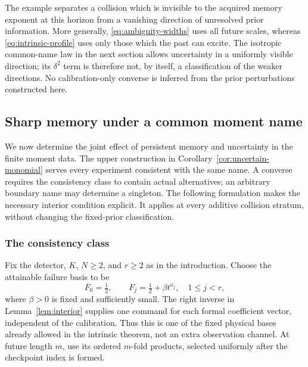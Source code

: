 The example separates a collision which is invisible to the acquired
memory exponent at this horizon from a vanishing direction of unresolved
prior information. More generally, \eqref{eq:ambiguity-widths} uses
all future scales, whereas \eqref{eq:intrinsic-profile} uses only those
which the past can excite. The isotropic common-name law in the next
section allows uncertainty in a uniformly visible direction; its
$\delta^2$ term is therefore not, by itself, a classification of the
weaker directions. No calibration-only converse is inferred from the
prior perturbations constructed here.


\subsection{Sharp memory under a common moment name}
\label{sec:uncertainty-geometry}
We now determine the joint effect of persistent memory and uncertainty in
the finite moment data. The upper construction in
Corollary~\ref{cor:uncertain-monomial} serves every experiment consistent
with the same name. A converse requires the consistency class to contain
actual alternatives; an arbitrary boundary name may determine a singleton.
The following formulation makes the necessary interior condition explicit.
It applies at every additive collision stratum, without changing the
fixed-prior classification.

\subsubsection{The consistency class}
Fix the detector, $K$, $N\ge2$, and $r\ge2$ as in the introduction.
Choose the attainable failure basis to be
\begin{equation}\label{eq:uncertainty-probe-basis}
 F_0=\tfrac12,\qquad F_j=\tfrac12+\beta t^{a_j},\quad 1\le j<r,
\end{equation}
where $\beta>0$ is fixed and sufficiently small. The right inverse in
Lemma~\ref{lem:interior} supplies one command for each formal coefficient
vector, independent of the calibration. Thus this is one of the fixed
physical bases already allowed in the intrinsic theorem, not an extra
observation channel. At future length $m$, use its ordered $m$-fold
products, selected uniformly after the checkpoint index is formed.

